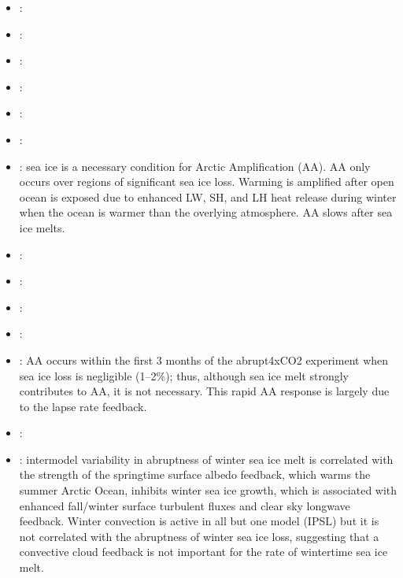 \documentclass{article}
\begin{document}
\begin{itemize}
\item \textbf{\cite{hay2018}}:
\item \textbf{\cite{hegyi2018}}:
\item \textbf{\cite{screen2018}}:
\item \textbf{\cite{taylor2018}}:
\item \textbf{\cite{zappa2018}}:
\item \textbf{\cite{blackport2019}}: 
\item \textbf{\cite{dai2019}}: sea ice is a necessary condition for Arctic Amplification (AA). AA only occurs over regions of significant sea ice loss. Warming is amplified after open ocean is exposed due to enhanced LW, SH, and LH heat release during winter when the ocean is warmer than the overlying atmosphere. AA slows after sea ice melts.
\item \textbf{\cite{overland2019}}: 
\item \textbf{\cite{screen2019}}: 
\item \textbf{\cite{blackport2020}}: 
\item \textbf{\cite{feldl2020}}: 
\item \textbf{\cite{previdi2020}}: AA occurs within the first 3 months of the abrupt4xCO2 experiment when sea ice loss is negligible (1--2\%); thus, although sea ice melt strongly contributes to AA, it is not necessary. This rapid AA response is largely due to the lapse rate feedback.
\item \textbf{\cite{blackport2021}}: 
\item \textbf{\cite{hankel2021}}: intermodel variability in abruptness of winter sea ice melt is correlated with the strength of the springtime surface albedo feedback, which warms the summer Arctic Ocean, inhibits winter sea ice growth, which is associated with enhanced fall/winter surface turbulent fluxes and clear sky longwave feedback. Winter convection is active in all but one model (IPSL) but it is not correlated with the abruptness of winter sea ice loss, suggesting that a convective cloud feedback \citep[e.g.,][]{abbot2008} is not important for the rate of wintertime sea ice melt.
\end{itemize}



\end{document}
